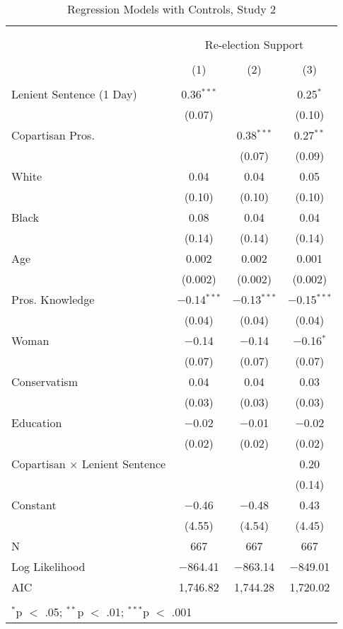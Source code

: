 \documentclass[12pt,letterpaper]{article}
\begin{document}
\begin{table}[!htbp] \centering   \caption{Regression Models with Controls, Study 2}   \label{} \begin{tabular}{@{\extracolsep{5pt}}lccc} \\[-1.8ex]\hline \\[-1.8ex] \\[-1.8ex] & \multicolumn{3}{c}{Re-election Support} \\ \\[-1.8ex] & (1) & (2) & (3)\\ \hline \\[-1.8ex]  Lenient Sentence (1 Day) & 0.36$^{***}$ &  & 0.25$^{*}$ \\   & (0.07) &  & (0.10) \\   Copartisan Pros. &  & 0.38$^{***}$ & 0.27$^{**}$ \\   &  & (0.07) & (0.09) \\   White & 0.04 & 0.04 & 0.05 \\   & (0.10) & (0.10) & (0.10) \\   Black & 0.08 & 0.04 & 0.04 \\   & (0.14) & (0.14) & (0.14) \\   Age & 0.002 & 0.002 & 0.001 \\   & (0.002) & (0.002) & (0.002) \\   Pros. Knowledge & $-$0.14$^{***}$ & $-$0.13$^{***}$ & $-$0.15$^{***}$ \\   & (0.04) & (0.04) & (0.04) \\   Woman & $-$0.14 & $-$0.14 & $-$0.16$^{*}$ \\   & (0.07) & (0.07) & (0.07) \\   Conservatism & 0.04 & 0.04 & 0.03 \\   & (0.03) & (0.03) & (0.03) \\   Education & $-$0.02 & $-$0.01 & $-$0.02 \\   & (0.02) & (0.02) & (0.02) \\   Copartisan $\times$ Lenient Sentence &  &  & 0.20 \\   &  &  & (0.14) \\   Constant & $-$0.46 & $-$0.48 & 0.43 \\   & (4.55) & (4.54) & (4.45) \\  N & 667 & 667 & 667 \\ Log Likelihood & $-$864.41 & $-$863.14 & $-$849.01 \\ AIC & 1,746.82 & 1,744.28 & 1,720.02 \\ \hline \\[-1.8ex] \multicolumn{4}{l}{$^{*}$p $<$ .05; $^{**}$p $<$ .01; $^{***}$p $<$ .001} \\ \end{tabular} \end{table} 





	
\end{document}
